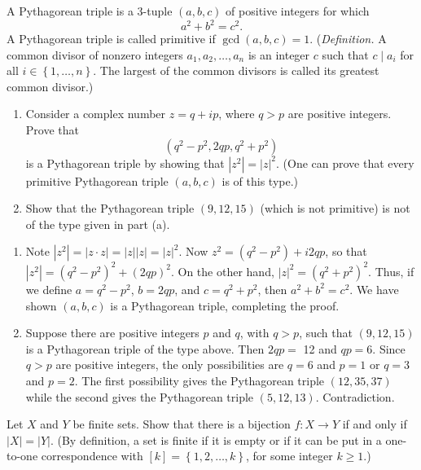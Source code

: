 \begin{questions}
\question
     A Pythagorean triple is a 3-tuple \((a, b, c)\) of positive integers for which
\[
a^2+b^2=c^2.
\] A Pythagorean triple is  called primitive if  \(\operatorname{gcd}(a, b, c)=1\). (\textit{Definition.} A common divisor of nonzero integers \(a_1, a_2, \ldots, a_n\) is an integer \(c\) such that \(c \mid a_i\) for all \(i\in \left\{ 1,\dots,n \right\}\). The largest of the common divisors   is called its greatest common divisor.)
\begin{enumerate}[label=(\alph*)]
    \item Consider a complex number \(z=q+i p\), where \(q>p\) are positive integers. Prove that
\[
\left(q^2-p^2, 2 q p, q^2+p^2\right)
\]
is a Pythagorean triple by showing that \(\left|z^2\right|=|z|^2\). (One can prove that every primitive Pythagorean triple \((a, b, c)\) is of this type.)
\item Show that the Pythagorean triple \((9,12,15)\) (which is not primitive) is not of the type given in part (a).

\end{enumerate}
\begin{theproof}
\begin{enumerate}[label=(\alph*)]
    \item Note \(|z^2| = |z\cdot z| = |z||z|=|z|^2\).
    Now \(z^2=\left(q^2-p^2\right)+i 2 q p\), so that \(\left|z^2\right|=\left(q^2-p^2\right)^2+(2 q p)^2\). On the other hand, \(|z|^2=\left(q^2+p^2\right)^2\). Thus, if we define \(a=q^2-p^2\), \(b=2 q p\), and \(c=q^2+p^2\), then \(a^2+b^2=c^2\). We have shown  \((a, b, c)\) is a Pythagorean triple, completing the proof.

    \item Suppose there are positive integers \(p\) and \(q\), with \(q>p\), such that  \((9,12,15)\) is a Pythagorean triple of the type above. Then \(2 q p=\) 12 and \(q p=6\). Since \(q>p\) are positive integers, the only possibilities are \(q=6\) and \(p=1\) or \(q=3\) and \(p=2\). The first possibility gives the Pythagorean triple \((12,35,37)\) while the second gives the Pythagorean triple \((5,12,13)\).  Contradiction.
\end{enumerate}
\end{theproof}


\question
    Let \(X\) and \(Y\) be finite sets. Show that there is a bijection \(f\colon X \rightarrow Y\) if and only if \(|X|=|Y|\). (By definition, a set is finite if it is empty or if it can be put in a one-to-one correspondence with \([k] = \left\{ 1,2,\ldots, k \right\}\), for some integer \(k\geq 1\).)


\end{questions}
